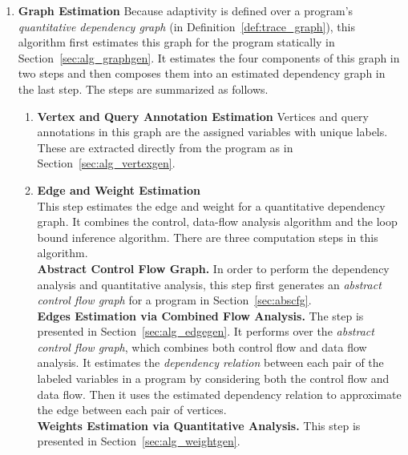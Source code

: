 \begin{enumerate}
  \item \textbf{Graph Estimation}
  Because adaptivity is defined over a program's \emph{quantitative dependency graph} (in Definition~\ref{def:trace_graph}),
  this algorithm first estimates this graph for the program statically
  in Section~\ref{sec:alg_graphgen}.
  It estimates the four components of this graph in two steps and then composes them into an estimated dependency graph
  in the last step.
  The steps are summarized  as follows.
\begin{enumerate}
  \item \textbf{Vertex and Query Annotation Estimation}
  Vertices and query annotations in this graph are the assigned variables with unique labels. These are extracted directly from the program as in Section~\ref{sec:alg_vertexgen}.
  \item \textbf{Edge and Weight Estimation}
  \\
  This step estimates the edge and weight for a quantitative dependency graph. It combines the control, data-flow  analysis algorithm and the loop bound inference algorithm.
  There are three computation steps in this algorithm.
  \\
  \textbf{Abstract Control Flow Graph.}
  In order to perform the dependency analysis and quantitative analysis, this step first generates an \emph{abstract control flow graph} for a program in Section~\ref{sec:abscfg}.
  \\
  \textbf{Edges Estimation via Combined Flow Analysis.} 
  The step is presented in
  Section~\ref{sec:alg_edgegen}. It performs over the \emph{abstract control flow graph}, which combines both control flow and data flow analysis.
  It estimates the \emph{dependency relation} between each pair of the labeled variables in a program by considering both the control flow and data flow.
  Then it uses the estimated dependency relation to approximate the edge
  between each pair of vertices.
  \\
  \textbf{Weights Estimation via Quantitative Analysis.} 
  This step is presented in Section~\ref{sec:alg_weightgen}. 

\end{enumerate}
\end{enumerate}
